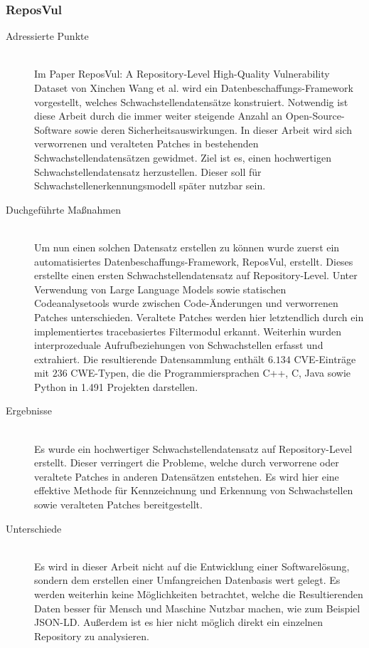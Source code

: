 \subsubsection{ReposVul} \label{sec:ReposVul}
    \begin{description}
        \item[Adressierte Punkte]\hfill \\
            Im Paper \glqq ReposVul: A Repository-Level High-Quality Vulnerability Dataset\grqq\textsuperscript{\cite{article:wang2024reposvul}} von Xinchen Wang et al. wird ein Datenbeschaffungs-Framework vorgestellt, welches Schwachstellendatensätze konstruiert.
            Notwendig ist diese Arbeit durch die immer weiter steigende Anzahl an Open-Source-Software sowie deren Sicherheitsauswirkungen.
            In dieser Arbeit wird sich verworrenen und veralteten Patches in bestehenden Schwachstellendatensätzen gewidmet.
            Ziel ist es, einen hochwertigen Schwachstellendatensatz herzustellen.
            Dieser soll für Schwachstellenerkennungsmodell später nutzbar sein.
        \item[Duchgeführte Maßnahmen]\hfill \\
            Um nun einen solchen Datensatz erstellen zu können wurde zuerst ein automatisiertes Daten\-be\-schaffungs-Framework, \glqq ReposVul\grqq, erstellt.
            Dieses erstellte einen ersten Schwachstellendatensatz auf Repository-Level.
            Unter Verwendung von Large Language Models sowie statischen Codeanalysetools wurde zwischen Code-Änderungen und verworrenen Patches unterschieden.
            Veraltete Patches werden hier letztendlich durch ein implementiertes tracebasiertes Filtermodul erkannt.
            Weiterhin wurden interprozeduale Aufrufbeziehungen von Schwachstellen erfasst und extrahiert.
            Die resultierende Datensammlung enthält $6.134$ CVE-Einträge mit $236$ CWE-Typen, die die Programmiersprachen C++, C, Java sowie Python in 1.491 Projekten darstellen.
        \item[Ergebnisse]\hfill \\
            Es wurde ein hochwertiger Schwachstellendatensatz auf Repository-Level erstellt.
            Dieser verringert die Probleme, welche durch verworrene oder veraltete Patches in anderen Datensätzen entstehen.
            Es wird hier eine effektive Methode für Kennzeichnung und Erkennung von Schwachstellen sowie veralteten Patches bereitgestellt.
        \item[Unterschiede]\hfill \\
            Es wird in dieser Arbeit nicht auf die Entwicklung einer Softwarelösung, sondern dem erstellen einer Umfangreichen Datenbasis wert gelegt.
            Es werden weiterhin keine Möglichkeiten betrachtet, welche die Resultierenden Daten besser für Mensch und Maschine Nutzbar machen, wie zum Beispiel \ac{JSON-LD}.
            Außerdem ist es hier nicht möglich direkt ein einzelnen Repository zu analysieren.
    \end{description}